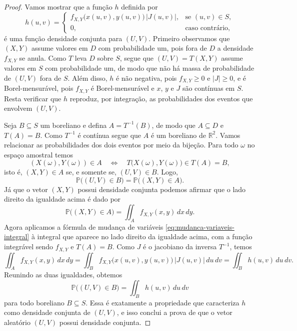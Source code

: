 \documentclass[12pt,portuguese]{article}
\theoremstyle{definition}
\theoremstyle{plainexercise}
\theoremstyle{starredexercise}
\theoremstyle{definition}
\begin{document}
\begin{proof}
Vamos mostrar que a função $h$ definida por
\[
  h(u, v) =
  \begin{cases}
    f_{X,Y}\bigl(x(u, v), y(u, v)\bigr)\,|J(u, v)|
    , & \text{se } (u, v) \in S,
    \\[0.2cm]
    0, & \text{caso contrário},
  \end{cases}
\]
é uma função densidade conjunta para $(U, V)$. Primeiro observamos que
$(X, Y)$ assume valores em $D$ com probabilidade um, pois fora de $D$ a
densidade $f_{X,Y}$ se anula. Como $T$ leva $D$ sobre $S$, segue que
$(U, V) = T(X, Y)$ assume valores em $S$ com probabilidade um, de modo que
não há massa de probabilidade de $(U, V)$ fora de $S$. Além disso, $h$ é
não negativa, pois $f_{X,Y} \geqslant 0$ e $|J| \geqslant 0$, e é
Borel-mensurável, pois $f_{X,Y}$ é Borel-mensurável e $x$, $y$ e $J$ são
contínuas em $S$. Resta verificar que $h$ reproduz, por integração, as
probabilidades dos eventos que envolvem $(U, V)$.

Seja $B \subseteq S$ um boreliano e defina $A = T^{-1}(B)$, de modo que
$A \subseteq D$ e $T(A) = B$. Como $T^{-1}$ é contínua segue que $A$ é um boreliano
de $\mathbb{R}^2$. Vamos relacionar as probabilidades dos dois eventos por
meio da bijeção. Para todo $\omega$ no espaço amostral temos 
\[
  (X(\omega), Y(\omega)) \in A
  \quad \Longleftrightarrow \quad
  T\bigl(X(\omega), Y(\omega)\bigr) \in T(A) = B,
\]
isto é, $(X, Y) \in A$ se, e somente se, $(U, V) \in B$. Logo,
\begin{equation}\label{eq:probabilidade-bijecao}
  \mathbb{P}\bigl((U, V) \in B\bigr)
  = \mathbb{P}\bigl((X, Y) \in A\bigr).
\end{equation}
Já que o vetor $(X,Y)$ possui densidade conjunta podemos afirmar que o lado direito da igualdade acima é 
dado por
\[
  \mathbb{P}\bigl((X, Y) \in A\bigr)
  = \iint_A f_{X,Y}(x, y)\,dx\,dy.
\]
Agora aplicamos a fórmula de mudança de variáveis
\eqref{eq:mudanca-variaveis-integral} à integral que aparece no lado direito da igualdade acima, 
com a função integrável sendo $f_{X,Y}$ e $T(A) = B$. Como $J$ é o jacobiano da
inversa $T^{-1}$, temos
\[
  \iint_A f_{X,Y}(x, y)\,dx\,dy
  = \iint_B f_{X,Y}\bigl(x(u, v), y(u, v)\bigr)\,|J(u, v)|\,du\,dv
  = \iint_B h(u, v)\,du\,dv.
\]
Reunindo as duas igualdades, obtemos
\[
  \mathbb{P}\bigl((U, V) \in B\bigr) = \iint_B h(u, v)\,du\,dv
\]
para todo boreliano $B \subseteq S$. Essa é exatamente a propriedade que
caracteriza $h$ como densidade conjunta de $(U, V)$, e isso conclui a
prova de que o vetor aleatório $(U, V)$ possui densidade conjunta.
\end{proof}
\end{document}
